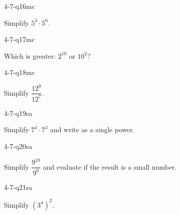 \begin{practiceQuestion}{4-7-q16}{mc}
\begin{questionText}
Simplify $5^3 \cdot 5^0$.
\end{questionText}
\end{practiceQuestion}

\begin{practiceQuestion}{4-7-q17}{mc}
\begin{questionText}
Which is greater: $2^{10}$ or $10^2$?
\end{questionText}
\end{practiceQuestion}

\begin{practiceQuestion}{4-7-q18}{mc}
\begin{questionText}
Simplify $\dfrac{12^9}{12^7}$.
\end{questionText}
\end{practiceQuestion}


\begin{practiceQuestion}{4-7-q19}{sa}
\begin{questionText}
Simplify $7^4 \cdot 7^3$ and write as a single power.
\end{questionText}
\end{practiceQuestion}

\begin{practiceQuestion}{4-7-q20}{sa}
\begin{questionText}
Simplify $\dfrac{9^{10}}{9^6}$ and evaluate if the result is a small number.
\end{questionText}
\end{practiceQuestion}

\begin{practiceQuestion}{4-7-q21}{sa}
\begin{questionText}
Simplify $(3^4)^2$.
\end{questionText}
\end{practiceQuestion}

